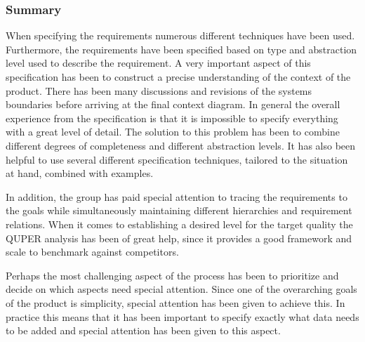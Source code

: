 \documentclass[10pt,a4paper]{article}
\begin{document}
\subsubsection*{Summary} When specifying the requirements numerous different techniques have been used. Furthermore, the requirements have been specified based on type and abstraction level used to describe the requirement. A very important aspect of this specification has been to construct a precise understanding of the context of the product. There has been many discussions and revisions of the systems boundaries before arriving at the final context diagram. In general the overall experience from the specification is that it is impossible to specify everything with a great level of detail. The solution to this problem has been to combine different degrees of completeness and different abstraction levels. It has also been helpful to use several different specification techniques, tailored to the situation at hand, combined with examples. 

In addition, the group has paid special attention to tracing the requirements to the goals while simultaneously maintaining different hierarchies and requirement relations. When it comes to establishing a desired level for the target quality the QUPER analysis has been of great help, since it provides a good framework and scale to benchmark against competitors. 

Perhaps the most challenging aspect of the process has been to prioritize and decide on which aspects need special attention. Since one of the overarching goals of the product is simplicity, special attention has been given to achieve this. In practice this means that it has been important to specify exactly what data needs to be added and special attention has been given to this aspect. 



\end{document}
